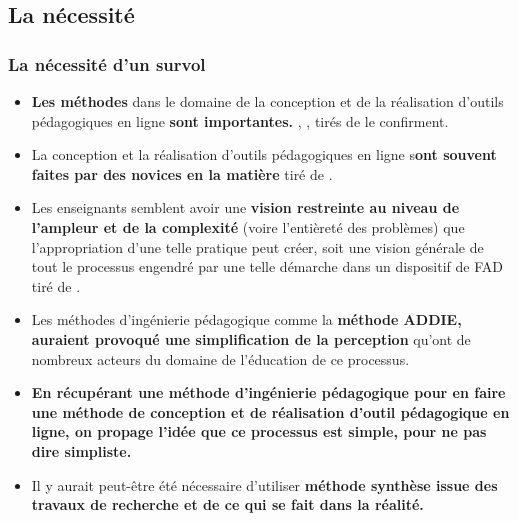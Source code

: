 \subsection{La nécessité} 
		\begin{frame}[allowframebreaks]
			\frametitle{La nécessité d’un survol}
                        
                        \begin{itemize} 
                        \item  \textbf{Les méthodes }dans le domaine de la conception et de la réalisation d’outils pédagogiques en ligne \textbf{sont importantes.} \citet[p. 842]{bohl2002a}, \citet[p. 218]{barry2003a}, \citet[p. 1]{hadjerrouit2007a} tirés de \cite{bonneau2013a} le confirment.
                        \item La conception et la réalisation d’outils pédagogiques en ligne s\textbf{ont souvent faites par des novices en la matière} \citep[p. 351]{verstegen2008a} tiré de \citet{bonneau2013a}.
                        \item Les enseignants semblent avoir une \textbf{vision restreinte au niveau de l’ampleur et de la complexité} (voire l’entièreté des problèmes) que l’appropriation d’une telle pratique peut créer, soit une vision générale de tout le processus engendré par une telle démarche dans un dispositif de FAD \citep[p. 105]{roy2011a} tiré de \citet{bonneau2013a}.
                        \item Les méthodes d’ingénierie pédagogique comme la \textbf{méthode ADDIE, auraient provoqué une simplification de la perception} qu’ont de nombreux acteurs du domaine de l’éducation de ce processus\citep[p.28]{bonneau2013a}.
                        \item \textbf{En récupérant une méthode d’ingénierie pédagogique pour en faire une méthode de conception et de réalisation d’outil pédagogique en ligne, on propage l’idée que ce processus est simple, pour ne pas dire simpliste\citep[p.29]{bonneau2013a}.}
                        \item Il y aurait peut-être été nécessaire d'utiliser \textbf{méthode synthèse issue des travaux de recherche et de ce qui se fait dans la réalité.}

                        \end{itemize}

             
                \end{frame}
                
